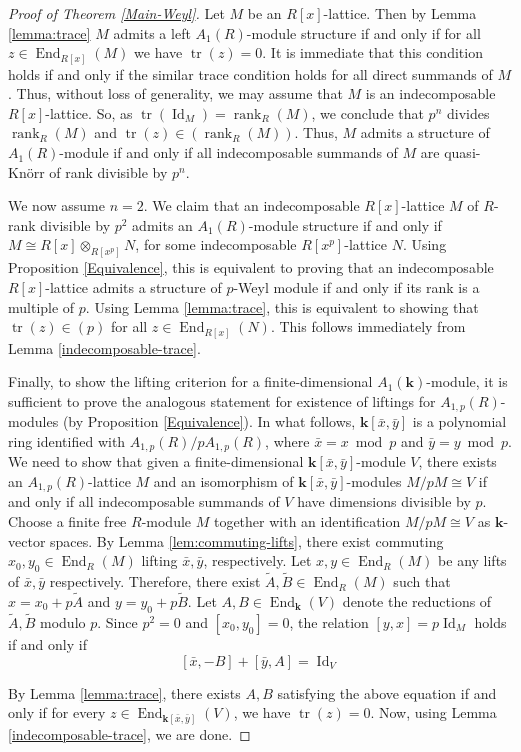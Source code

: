 \documentclass[12pt,letterpaper]{amsart}
\theoremstyle{plain}
\theoremstyle{definition}
\DeclareMathOperator{\tr}{tr}
\DeclareMathOperator{\End}{End}
\DeclareMathOperator{\Id}{Id}
\DeclareMathOperator{\rank}{rank}
\begin{document}
\begin{proof}[Proof of Theorem \ref{Main-Weyl}]
Let $M$ be an $R[x]$-lattice. Then by Lemma \ref{lemma:trace} $M$ admits a left $A_1(R)$-module structure if and only
if for all $z\in \End_{R[x]}(M)$  we have $\tr(z)=0$. It is immediate that this condition holds if and only if the similar trace condition holds for all direct summands of $M$.  Thus, without loss of generality, we may assume that $M$ is an indecomposable $R[x]$-lattice.
So, as $\tr(\Id_M)=\rank_R(M)$,  we conclude that $p^n$ divides $\rank_R(M)$  and $\tr(z)\in (\rank_R(M))$.  Thus, $M$ admits a structure of $A_1(R)$-module if and only if all indecomposable summands of $M$ are quasi-Kn\"{o}rr of rank divisible by $p^n$. 


We now assume $n=2$. We claim that an indecomposable $R[x]$-lattice $M$ of $R$-rank divisible by $p^2$ admits an $A_1(R)$-module structure
if and only if $M\cong R[x]\otimes_{R[x^p]}N$, for some indecomposable $R[x^p]$-lattice $N$.   Using Proposition \ref{Equivalence}, this is equivalent to proving that an indecomposable 
$R[x]$-lattice  admits a structure of $p$-Weyl module if and only if its rank is a multiple of $p$. Using Lemma \ref{lemma:trace}, this is equivalent to showing that $\tr(z)\in (p)$ for all $z\in \End_{R[x]}(N)$. This follows immediately from Lemma \ref{indecomposable-trace}.


Finally, to show the lifting criterion for a finite-dimensional $A_1(\mathbf{k})$-module, it is sufficient to prove the analogous statement for
existence of liftings for $A_{1, p}(R)$-modules (by Proposition \ref{Equivalence}).
In what follows, $\mathbf{k}[\bar{x},\bar{y}]$ is a polynomial ring identified with $A_{1,p}(R)/pA_{1,p}(R)$, where $\bar{x}=x\bmod p$ and $\bar{y}=y\bmod p$. 
We need to show that given a finite-dimensional $\mathbf{k}[\bar{x}, \bar{y}]$-module $V$, 
there exists an $A_{1,p}(R)$-lattice $M$ and an isomorphism of $\mathbf{k}[\bar{x}, \bar{y}]$-modules
$M/pM\cong V$ if and only if all indecomposable summands of $V$ have dimensions divisible by $p$. 
 Choose a finite free $R$-module $M$ together with an identification $M/pM\cong V$ as $\mathbf{k}$-vector spaces.
 By Lemma \ref{lem:commuting-lifts}, there exist commuting $x_0,y_0\in\End_R(M)$ lifting $\bar{x},\bar{y}$, respectively. 
 Let $x, y\in \End_R(M)$  be any lifts of $\bar{x}, \bar{y}$  respectively.
 Therefore, there exist $\widetilde A,\widetilde B\in\End_R(M)$ such that $x=x_0+p\widetilde A$ and $y=y_0+p\widetilde B$. Let $A,B\in\End_{\mathbf{k}}(V)$ denote the reductions of $\widetilde A,\widetilde B$ modulo $p$. Since $p^2=0$ and $[x_0,y_0]=0$, the relation $[y,x]=p\Id_M$ holds if and only if
$$[\bar{x}, -B]+[\bar{y}, A]=\Id_V$$

By Lemma \ref{lemma:trace}, there exists $A, B$ satisfying the above equation if and only if for every $z\in\End_{\mathbf{k}[\bar{x},\bar{y}]}(V)$, 
we have $\tr(z)=0$. Now, using Lemma \ref{indecomposable-trace}, we are done.

 
 

\end{proof}
\end{document}

